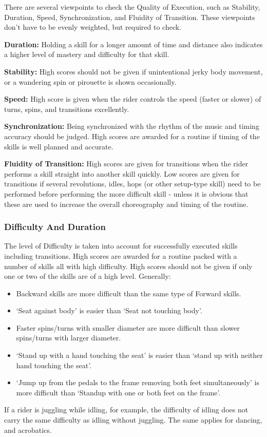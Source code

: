 There are several viewpoints to check the Quality of Execution, such as Stability, Duration, Speed, Synchronization, and Fluidity of Transition.
These viewpoints don't have to be evenly weighted, but required to check.

\textbf{Duration:} Holding a skill for a longer amount of time and distance also indicates a higher level of mastery and difficulty for that skill.

\textbf{Stability:} High scores should not be given if unintentional jerky body movement, or a wandering spin or pirouette is shown occasionally.

\textbf{Speed:} High score is given when the rider controls the speed (faster or slower) of turns, spins, and transitions excellently.

\textbf{Synchronization:} Being synchronized with the rhythm of the music and timing accuracy should be judged.
High scores are awarded for a routine if timing of the skills is well planned and accurate.

\textbf{Fluidity of Transition:} High scores are given for transitions when the rider performs a skill straight into another skill quickly.
Low scores are given for transitions if several revolutions, idles, hops (or other setup-type skill) need to be performed before performing the more difficult skill - unless it is obvious that these are used to increase the overall choreography and timing of the routine.

\subsubsection{Difficulty And Duration}

The level of Difficulty is taken into account for successfully executed skills including transitions.
High scores are awarded for a routine packed with a number of skills all with high difficulty.
High scores should not be given if only one or two of the skills are of a high level.
Generally:
\begin{itemize} 
\item Backward skills are more difficult than the same type of Forward skills.
\item `Seat against body' is easier than `Seat not touching body'.
\item Faster spins/turns with smaller diameter are more difficult than slower spins/turns with larger diameter.
\item `Stand up with a hand touching the seat' is easier than `stand up with neither hand touching the seat'.
\item `Jump up from the pedals to the frame removing both feet simultaneously' is more difficult than `Standup with one or both feet on the frame'.
\end{itemize}
If a rider is juggling while idling, for example, the difficulty of idling does not carry the same difficulty as idling without juggling.
The same applies for dancing, and acrobatics.

